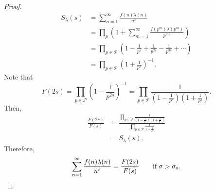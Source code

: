 \documentclass[12pt]{article}
\begin{document}
\begin{proof}
    \begin{align*}
        S_\lambda(s)&=\sum_{n=1}^{\infty}\frac{f(n)\lambda(n)}{n^s}\\
        &=\prod_{p}\left(1+\sum_{m=1}^{\infty}\frac{f(p^m)\lambda(p^m)}{p^{ms}}\right)\\
        &=\prod_{p\in\mathcal{P}}\left(1-\frac{1}{p^{s}}+\frac{1}{p^{2s}}-\frac{1}{p^{3s}}+\cdots\right)\\
        &=\prod_{p\in\mathcal{P}}\left(1+\frac{1}{p^s}\right)^{-1}.
    \end{align*}
    Note that
    \[
        F(2s)=\prod_{p\in\mathcal{P}}\left(1-\frac{1}{p^{2s}}\right)^{-1}=\prod_{p\in\mathcal{P}}\frac{1}{(1-\frac{1}{p^{s}})(1+\frac{1}{p^{s}})}.
    \]
    Then,
    \begin{align*}
        \frac{F(2s)}{F(s)}&=\frac{\displaystyle{\prod_{p\in\mathcal{P}}\frac{1}{(1-\frac{1}{p^{s}})(1+\frac{1}{p^{s}})}}}{\displaystyle{\prod_{p\in\mathcal{P}}\frac{1}{1-\frac{1}{p^{s}}}}}\\
        &=S_\lambda(s).
    \end{align*}
    Therefore,
    \[
        \sum_{n=1}^{\infty}\frac{f(n)\lambda(n)}{n^s}=\frac{F(2s)}{F(s)}\quad\quad\text{if}\;\sigma>\sigma_a.\qedhere
    \]
\end{proof}
\end{document}
